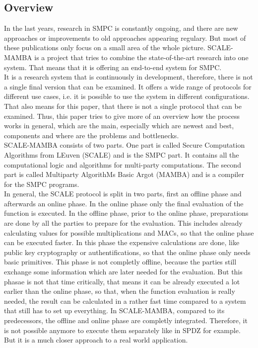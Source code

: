 \documentclass[english,runningheads,a4paper]{llncs}[2018/03/10]
\begin{document}
\subsection{Overview}

In the last years, research in SMPC is constantly ongoing, and there are new approaches or improvements to old approaches appearing regulary. But most of these publications only focus on a small area of the whole picture. SCALE-MAMBA\cite{ScaleMambaDocu} is a project that tries to combine the state-of-the-art research into one system. That means that it is offering an end-to-end system for SMPC.\\
It is a research system that is continuously in development, therefore, there is not a single final version that can be examined. It offers a wide range of protocols for different use cases, i.e. it is possible to use the system in different configurations. That also means for this paper, that there is not a single protocol that can be examined. Thus, this paper tries to give more of an overview how the process works in general, which are the main, especially which are newest and best, components and where are the problems and bottlenecks.\\ 
SCALE-MAMBA consists of two parts. One part is called Secure Computation Algorithms from LEuven (SCALE) and is the SMPC part. It contains all the computational logic and algorithms for multi-party computations. The second part is called Multiparty AlgorithMs Basic Argot (MAMBA) and is a compiler for the SMPC programs.\\
 
In general, the SCALE protocol is split in two parts, first an offline phase and afterwards an online phase. In the online phase only the final evaluation of the function is executed. In the offline phase, prior to the online phase, preparations are done by all the parties to prepare for the evaluation. This includes already calculating values for possible multiplications and MACs, so that the online phase can be executed faster. In this phase the expensive calculations are done, like public key cryptography or authentifications, so that the online phase only needs basic primitives. This phase is not completly offline, because the parties still exchange some information which are later needed for the evaluation. But this phasae is not that time critically, that means it can be already executed a lot earlier than the online phase, so that, when the function evaluation is really needed, the result can be calculated in a rather fast time compared to a system that still has to set up everything. In SCALE-MAMBA, compared to its predecessors, the offline and online phase are completly integrated. Therefore, it is not possible anymore to execute them separately like in SPDZ for example. But it is a much closer approach to a real world application.\\
\end{document}
